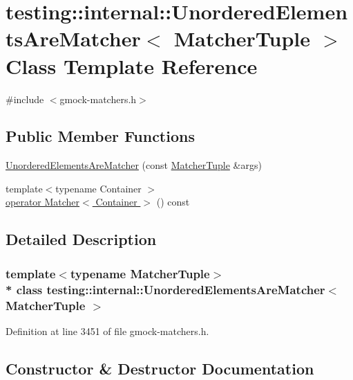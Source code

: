 \hypertarget{classtesting_1_1internal_1_1_unordered_elements_are_matcher}{}\section{testing\+:\+:internal\+:\+:Unordered\+Elements\+Are\+Matcher$<$ Matcher\+Tuple $>$ Class Template Reference}
\label{classtesting_1_1internal_1_1_unordered_elements_are_matcher}


{\ttfamily \#include $<$gmock-\/matchers.\+h$>$}

\subsection*{Public Member Functions}
\begin{DoxyCompactItemize}
\item 
\hyperlink{classtesting_1_1internal_1_1_unordered_elements_are_matcher_ae0a46833600dc8ef768d154ab111f5fa}{Unordered\+Elements\+Are\+Matcher} (const \hyperlink{structtesting_1_1internal_1_1_matcher_tuple}{Matcher\+Tuple} \&args)
\item 
{\footnotesize template$<$typename Container $>$ }\\\hyperlink{classtesting_1_1internal_1_1_unordered_elements_are_matcher_a62a2a9e28b031cb9b534b1d46f1cb4fd}{operator Matcher$<$ Container $>$} () const 
\end{DoxyCompactItemize}


\subsection{Detailed Description}
\subsubsection*{template$<$typename Matcher\+Tuple$>$\\*
class testing\+::internal\+::\+Unordered\+Elements\+Are\+Matcher$<$ Matcher\+Tuple $>$}



Definition at line 3451 of file gmock-\/matchers.\+h.



\subsection{Constructor \& Destructor Documentation}
